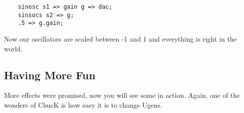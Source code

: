 \begin{verbatim}
	sinosc s1 => gain g => dac;
	sinsocs s2 => g;
	.5 => g.gain;
\end{verbatim}

Now our oscillators are scaled between -1 and 1 and everything is right in the world.

\subsection{Having More Fun}

More effects were promised, now you will see some in action. Again, one of the wonders of ChucK is how easy it is to change Ugens. 